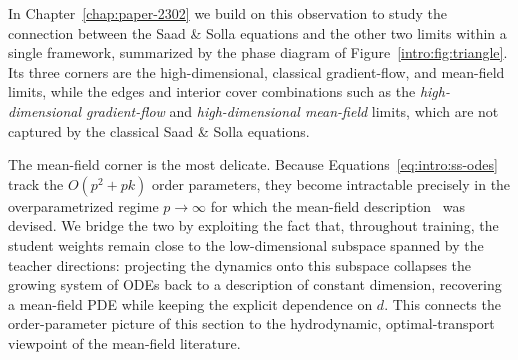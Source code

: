 In Chapter~\ref{chap:paper-2302} we build on this observation to study the connection between the Saad \& Solla equations and the other two limits within a single framework, summarized by the phase diagram of Figure~\ref{intro:fig:triangle}. Its three corners are the high-dimensional, classical gradient-flow, and mean-field limits, while the edges and interior cover combinations such as the \emph{high-dimensional gradient-flow} and \emph{high-dimensional mean-field} limits, which are not captured by the classical Saad \& Solla equations.

The mean-field corner is the most delicate. Because Equations~\eqref{eq:intro:ss-odes} track the \(O(p^2 + pk)\) order parameters, they become intractable precisely in the overparametrized regime \(p\to\infty\) for which the mean-field description~\cite{mei2018mean,chizat2018global,rotskoff2022trainability,sirignano2020mean} was devised. We bridge the two by exploiting the fact that, throughout training, the student weights remain close to the low-dimensional subspace spanned by the teacher directions: projecting the dynamics onto this subspace collapses the growing system of ODEs back to a description of constant dimension, recovering a mean-field PDE while keeping the explicit dependence on \(d\). This connects the order-parameter picture of this section to the hydrodynamic, optimal-transport viewpoint of the mean-field literature.
